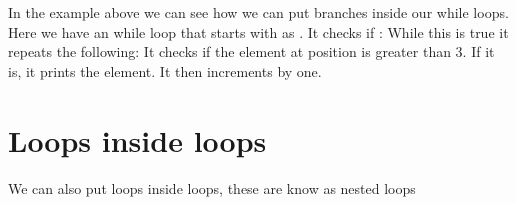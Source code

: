 \documentclass[letterpaper,10pt,english]{jupyterBook}
\begin{document}
\sphinxAtStartPar
In the example above we can see how we can put branches inside our while loops. Here we have an while loop that starts with  as . It checks if : While this is true it repeats the following:
It checks if the element at position  is greater than 3. If it is, it prints the element. It then increments  by one.


\section{Loops inside loops}
\label{\detokenize{loops:loops-inside-loops}}
\sphinxAtStartPar
We can also put loops inside loops, these are know as nested loops
\end{document}
